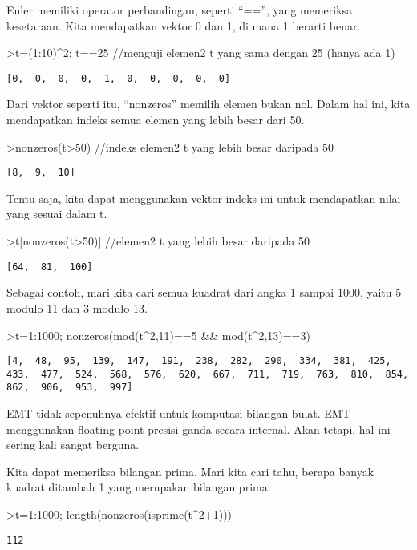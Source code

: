 \documentclass[
]{book}
\begin{document}
Euler memiliki operator perbandingan, seperti ``=='', yang memeriksa kesetaraan. Kita mendapatkan vektor 0 dan 1, di mana 1 berarti benar.

\textgreater t=(1:10)\^{}2; t==25 //menguji elemen2 t yang sama dengan 25 (hanya ada 1)

\begin{verbatim}
[0,  0,  0,  0,  1,  0,  0,  0,  0,  0]
\end{verbatim}

Dari vektor seperti itu, ``nonzeros'' memilih elemen bukan nol. Dalam hal ini, kita mendapatkan indeks semua elemen yang lebih besar dari 50.

\textgreater nonzeros(t\textgreater50) //indeks elemen2 t yang lebih besar daripada 50

\begin{verbatim}
[8,  9,  10]
\end{verbatim}

Tentu saja, kita dapat menggunakan vektor indeks ini untuk mendapatkan nilai yang sesuai dalam t.

\textgreater t{[}nonzeros(t\textgreater50){]} //elemen2 t yang lebih besar daripada 50

\begin{verbatim}
[64,  81,  100]
\end{verbatim}

Sebagai contoh, mari kita cari semua kuadrat dari angka 1 sampai 1000, yaitu 5 modulo 11 dan 3 modulo 13.

\textgreater t=1:1000; nonzeros(mod(t\^{}2,11)==5 \&\& mod(t\^{}2,13)==3)

\begin{verbatim}
[4,  48,  95,  139,  147,  191,  238,  282,  290,  334,  381,  425,
433,  477,  524,  568,  576,  620,  667,  711,  719,  763,  810,  854,
862,  906,  953,  997]
\end{verbatim}

EMT tidak sepenuhnya efektif untuk komputasi bilangan bulat. EMT menggunakan floating point presisi ganda secara internal. Akan tetapi, hal ini sering kali sangat berguna.

Kita dapat memeriksa bilangan prima. Mari kita cari tahu, berapa banyak kuadrat ditambah 1 yang merupakan bilangan prima.

\textgreater t=1:1000; length(nonzeros(isprime(t\^{}2+1)))

\begin{verbatim}
112
\end{verbatim}
\end{document}
